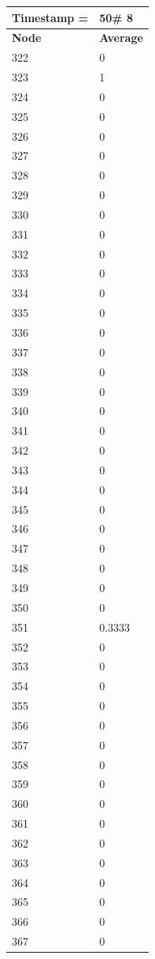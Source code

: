 \begin{tabular}{|l||l|}
\hline
\textbf{Timestamp =} & \textbf{50}\# 8\\\hline
	\textbf{Node} & \textbf{Average} \\ \hline
\hline
	322 & 0 \\ \hline
	323 & 1 \\ \hline
	324 & 0 \\ \hline
	325 & 0 \\ \hline
	326 & 0 \\ \hline
	327 & 0 \\ \hline
	328 & 0 \\ \hline
	329 & 0 \\ \hline
	330 & 0 \\ \hline
	331 & 0 \\ \hline
	332 & 0 \\ \hline
	333 & 0 \\ \hline
	334 & 0 \\ \hline
	335 & 0 \\ \hline
	336 & 0 \\ \hline
	337 & 0 \\ \hline
	338 & 0 \\ \hline
	339 & 0 \\ \hline
	340 & 0 \\ \hline
	341 & 0 \\ \hline
	342 & 0 \\ \hline
	343 & 0 \\ \hline
	344 & 0 \\ \hline
	345 & 0 \\ \hline
	346 & 0 \\ \hline
	347 & 0 \\ \hline
	348 & 0 \\ \hline
	349 & 0 \\ \hline
	350 & 0 \\ \hline
	351 & 0.3333 \\ \hline
	352 & 0 \\ \hline
	353 & 0 \\ \hline
	354 & 0 \\ \hline
	355 & 0 \\ \hline
	356 & 0 \\ \hline
	357 & 0 \\ \hline
	358 & 0 \\ \hline
	359 & 0 \\ \hline
	360 & 0 \\ \hline
	361 & 0 \\ \hline
	362 & 0 \\ \hline
	363 & 0 \\ \hline
	364 & 0 \\ \hline
	365 & 0 \\ \hline
	366 & 0 \\ \hline
	367 & 0 \\ \hline
\end{tabular}
